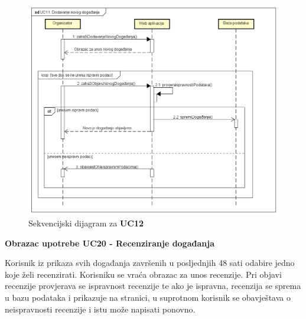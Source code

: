 				\begin{figure}[H]
					\includegraphics[width=\textwidth]{dijagrami/sd1.PNG}
					\centering
					\caption{Sekvencijski dijagram za \textbf{UC12}}
					\label{fig:promjene}
				\end{figure}
				
				\newpage
				
				\noindent \textbf{Obrazac upotrebe UC20 - Recenziranje događanja}
				
				\noindent Korisnik iz prikaza svih događanja završenih u posljednjih 48 sati odabire jedno koje želi recenzirati. Korisniku se vraća obrazac za unos recenzije. Pri objavi recenzije provjerava se ispravnost recenzije te ako je ispravna, recenzija se sprema u bazu podataka i prikazuje na stranici, u suprotnom korisnik se obavještava o neispravnosti recenzije i istu može napisati ponovno.
				
